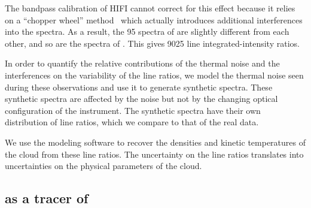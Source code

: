 The bandpass calibration of HIFI cannot correct for this effect because it relies on a ``chopper wheel'' method~\parencite{kutner1981recommendations,ossenkopf2002intensity} which actually introduces additional interferences into the spectra.
As a result, the 95 spectra of  are slightly different from each other, and so are the spectra of .
This gives 9025 line integrated-intensity ratios.

In order to quantify the relative contributions of the thermal noise and the interferences on the variability of the line ratios, we model the thermal noise seen during these observations and use it to generate synthetic spectra.
These synthetic spectra are affected by the noise but not by the changing optical configuration of the instrument.
The synthetic spectra have their own distribution of line ratios, which we compare to that of the real data.

We use the \radex{} modeling software \parencite{vandertak2007radex}
to recover the densities and kinetic temperatures of the cloud from these line ratios.
The uncertainty on the line ratios translates into uncertainties on the physical parameters of the cloud.




\subsection{\texorpdfstring{ as a tracer of }{CO as a tracer of H2}}

